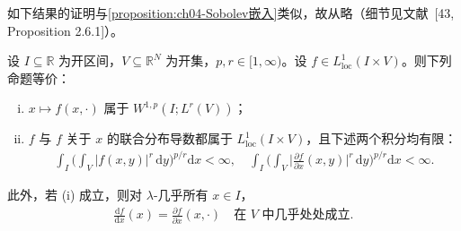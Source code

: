 \documentclass[../../main.tex]{subfiles}%
\begin{document}
如下结果的证明与\cref{proposition:ch04-Sobolev嵌入}类似，故从略（细节见文献~[43, Proposition 2.6.1]）。

\begin{proposition}\label{proposition:ch04-区间Sobolev}
设 $I\subseteq\mathbb{R}$ 为开区间，$V\subseteq\mathbb{R}^N$ 为开集，$p,r\in[1,\infty)$。设 $f\in L^1_{\mathrm{loc}}(I\times V)$。则下列命题等价：
\begin{enumerate}[(i)]
\item\label{item:ch04-区间Sobolev-i} $x\mapsto f(x,\cdot)$ 属于 $W^{1,p}(I;L^r(V))$；
\item\label{item:ch04-区间Sobolev-ii} $f$ 与 $f$ 关于 $x$ 的联合分布导数都属于 $L^1_{\mathrm{loc}}(I\times V)$，且下述两个积分均有限：
\begin{align}
\int_I\Big(\int_V|f(x,y)|^r\,\mathrm{d}y\Big)^{p/r}\mathrm{d}x<\infty,\quad
\int_I\Big(\int_V\Big|\frac{\partial f}{\partial x}(x,y)\Big|^r\,\mathrm{d}y\Big)^{p/r}\mathrm{d}x<\infty . \label{align:ch04-4.128}
\end{align}
\end{enumerate}
此外，若 (i) 成立，则对 $\lambda$-几乎所有 $x\in I$，
\begin{align}
\frac{\mathrm{d}f}{\mathrm{d}x}(x)=\frac{\partial f}{\partial x}(x,\cdot)\quad\text{在 }V\text{ 中几乎处处成立}. \label{align:ch04-4.129}
\end{align}
\end{proposition}
\end{document}
